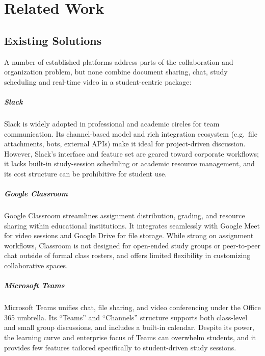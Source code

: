 \chapter{Related Work}\label{chapter:chap2}

\section{Existing Solutions}

A number of established platforms address parts of the collaboration and organization problem, but none combine document sharing, chat, study scheduling and real-time video in a student-centric package:

\paragraph{Slack}\cite{Slack}  
Slack is widely adopted in professional and academic circles for team communication.  Its channel-based model and rich integration ecosystem (e.g.\ file attachments, bots, external APIs) make it ideal for project-driven discussion.  However, Slack’s interface and feature set are geared toward corporate workflows; it lacks built-in study-session scheduling or academic resource management, and its cost structure can be prohibitive for student use.

\paragraph{Google Classroom}\cite{Classroom}  
Google Classroom streamlines assignment distribution, grading, and resource sharing within educational institutions.  It integrates seamlessly with Google Meet for video sessions and Google Drive for file storage.  While strong on assignment workflows, Classroom is not designed for open‐ended study groups or peer-to-peer chat outside of formal class rosters, and offers limited flexibility in customizing collaborative spaces.

\paragraph{Microsoft Teams}\cite{Teams}  
Microsoft Teams unifies chat, file sharing, and video conferencing under the Office 365 umbrella.  Its “Teams” and “Channels” structure supports both class-level and small group discussions, and includes a built-in calendar.  Despite its power, the learning curve and enterprise focus of Teams can overwhelm students, and it provides few features tailored specifically to student-driven study sessions.

